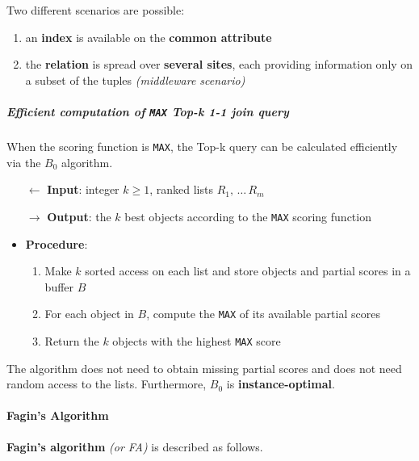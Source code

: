 \documentclass[english]{article}
\begin{document}
Two different scenarios are possible:

\begin{enumerate}
  \item an \textbf{index} is available on the \textbf{common attribute}
  \item the \textbf{relation} is spread over \textbf{several sites}, each providing information only on a subset of the tuples \textit{(middleware scenario)}
\end{enumerate}

\subparagraph*{Efficient computation of \texttt{MAX} Top-k 1-1 join query}
When the scoring function is \texttt{MAX}, the Top-k query can be calculated efficiently via the \(B_0\) algorithm.

\begin{itemize}
  \item[\(\leftarrow\)] \textbf{Input}: integer \(k \geq 1\), ranked lists \(R_1, \,\ldots\, R_m\)
  \item[\(\rightarrow\)] \textbf{Output}: the \(k\) best objects according to the \texttt{MAX} scoring function
  \item \textbf{Procedure}:
        \begin{enumerate}[label=step \arabic*., ref=step (\arabic*), widest*=7, leftmargin=*, labelindent=1em]
          \item Make \(k\) sorted access on each list and store objects and partial scores in a buffer \(B\)
          \item For each object in \(B\), compute the \texttt{MAX} of its available partial scores
          \item Return the \(k\) objects with the highest \texttt{MAX} score
        \end{enumerate}
\end{itemize}

The algorithm does not need to obtain missing partial scores and does not need random access to the lists.
Furthermore, \(B_0\) is \textbf{instance-optimal}.

\paragraph{Fagin's Algorithm}
\textbf{Fagin's algorithm} \textit{(or FA)} is described as follows.
\end{document}
